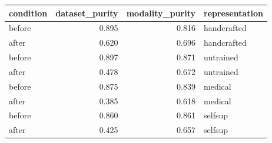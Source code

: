 \begin{tabular}{lrrl}
\toprule
condition & dataset\_purity & modality\_purity & representation \\
\midrule
before & 0.895 & 0.816 & handcrafted \\
after & 0.620 & 0.696 & handcrafted \\
before & 0.897 & 0.871 & untrained \\
after & 0.478 & 0.672 & untrained \\
before & 0.875 & 0.839 & medical \\
after & 0.385 & 0.618 & medical \\
before & 0.860 & 0.861 & selfsup \\
after & 0.425 & 0.657 & selfsup \\
\bottomrule
\end{tabular}
